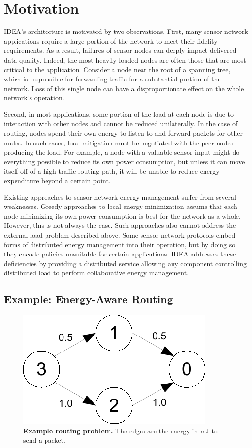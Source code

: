 \section{Motivation}
\label{idea-sec-motivation}

IDEA's architecture is motivated by two observations. First, many sensor
network applications require a large portion of the network to meet their
fidelity requirements. As a result, failures of sensor nodes can deeply
impact delivered data quality. Indeed, the most heavily-loaded nodes are
often those that are most critical to the application. Consider a node near
the root of a spanning tree, which is responsible for forwarding traffic for
a substantial portion of the network. Loss of this single node can have a
disproportionate effect on the whole network's operation.

Second, in most applications, some portion of the load at each node is due to
interaction with other nodes and cannot be reduced unilaterally. In the case
of routing, nodes spend their own energy to listen to and forward packets for
other nodes. In such cases, load mitigation must be negotiated with the peer
nodes producing the load. For example, a node with a valuable sensor input
might do everything possible to reduce its own power consumption, but unless
it can move itself off of a high-traffic routing path, it will be unable to
reduce energy expenditure beyond a certain point.

Existing approaches to sensor network energy management suffer from several
weaknesses. Greedy approaches to local energy minimization assume that each
node minimizing its own power consumption is best for the network as a whole.
However, this is not always the case. Such approaches also cannot address the
external load problem described above. Some sensor network protocols embed
forms of distributed energy management into their operation, but by doing so
they encode policies unsuitable for certain applications. IDEA addresses
these deficiencies by providing a distributed service allowing any component
controlling distributed load to perform collaborative energy management.

\subsection{Example: Energy-Aware Routing}

\begin{figure}[t]
\begin{center}
\includegraphics[width=0.5\hsize]{./5-idea/figs/motivationexample.pdf}
\end{center}
\caption{\textbf{Example routing problem.} The edges are the energy in mJ to
send a packet.}
\label{idea-fig-motivationexample}
\end{figure}

